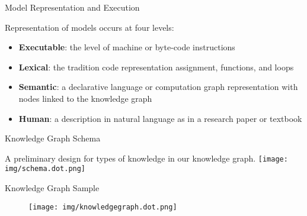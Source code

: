 \documentclass[ignorenonframetext,]{beamer}
\providecommand{\tightlist}{%
  \setlength{\itemsep}{0pt}\setlength{\parskip}{0pt}}
\begin{document}
\begin{frame}{Model Representation and Execution}
\protect\hypertarget{model-representation-and-execution}{}

Representation of models occurs at four levels:

\begin{itemize}
\item
  \textbf{Executable}: the level of machine or byte-code instructions
\item
  \textbf{Lexical}: the tradition code representation assignment,
  functions, and loops
\item
  \textbf{Semantic}: a declarative language or computation graph
  representation with nodes linked to the knowledge graph
\item
  \textbf{Human}: a description in natural language as in a research
  paper or textbook
\end{itemize}

\end{frame}

\begin{frame}{Knowledge Graph Schema}
\protect\hypertarget{knowledge-graph-schema}{}

A preliminary design for types of knowledge in our knowledge graph.
\texttt{[image: img/schema.dot.png]}



\end{frame}

\begin{frame}{Knowledge Graph Sample}
\protect\hypertarget{knowledge-graph}{}

\begin{figure}
\centering
\texttt{[image: img/knowledgegraph.dot.png]}
\end{figure}


\end{frame}
\end{document}
